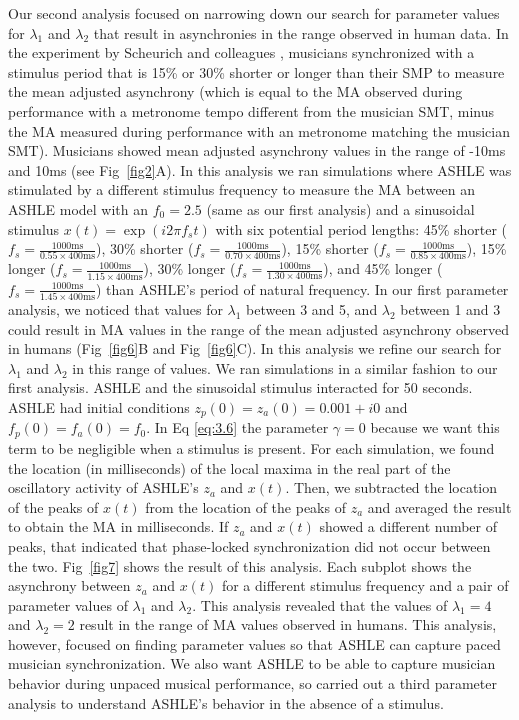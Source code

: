 \documentclass[10pt,letterpaper]{article}
\begin{document}
Our second analysis focused on narrowing down our search for parameter values for $\lambda_1$ and $\lambda_2$ that result in asynchronies in the range observed in human data. In the experiment by Scheurich and colleagues \cite{scheurich2018tapping}, musicians synchronized with a stimulus period that is 15\% or 30\% shorter or longer than their SMP to measure the mean adjusted asynchrony (which is equal to the MA observed during performance with a metronome tempo different from the musician SMT, minus the MA measured during performance with an metronome matching the musician SMT). Musicians showed mean adjusted asynchrony values in the range of -10ms and 10ms (see Fig~\ref{fig2}A). In this analysis we ran simulations where ASHLE was stimulated by a different stimulus frequency to measure the MA between an ASHLE model with an $f_0 = 2.5$ (same as our first analysis) and a sinusoidal stimulus $x(t) = \exp(i2\pi f_s t)$ with six potential period lengths: 45\% shorter ($f_s = \frac{1000\text{ms}}{0.55 \times 400\text{ms}}$), 30\% shorter ($f_s = \frac{1000\text{ms}}{0.70 \times 400\text{ms}}$), 15\% shorter ($f_s = \frac{1000\text{ms}}{0.85 \times 400\text{ms}}$), 15\% longer ($f_s = \frac{1000\text{ms}}{1.15 \times 400\text{ms}}$), 30\% longer ($f_s = \frac{1000\text{ms}}{1.30 \times 400\text{ms}}$), and 45\% longer ($f_s = \frac{1000\text{ms}}{1.45 \times 400\text{ms}}$) than ASHLE's period of natural frequency. In our first parameter analysis, we noticed that values for $\lambda_1$ between 3 and 5, and $\lambda_2$ between 1 and 3 could result in MA values in the range of the mean adjusted asynchrony observed in humans (Fig~\ref{fig6}B and Fig~\ref{fig6}C). In this analysis we refine our search for $\lambda_1$ and $\lambda_2$ in this range of values. We ran simulations in a similar fashion to our first analysis. ASHLE and the sinusoidal stimulus interacted for 50 seconds. ASHLE had initial conditions $z_p(0)=z_a(0)= 0.001 + i0$ and $f_p(0)=f_a(0)=f_0$. In Eq \eqref{eq:3.6} the parameter $\gamma=0$ because we want this term to be negligible when a stimulus is present. For each simulation, we found the location (in milliseconds) of the local maxima in the real part of the oscillatory activity of ASHLE's $z_a$ and $x(t)$. Then, we subtracted the location of the peaks of $x(t)$ from the location of the peaks of $z_a$ and averaged the result to obtain the MA in milliseconds. If $z_a$ and $x(t)$ showed a different number of peaks, that indicated that phase-locked synchronization did not occur between the two. Fig~\ref{fig7} shows the result of this analysis. Each subplot shows the asynchrony between $z_a$ and $x(t)$ for a different stimulus frequency and a pair of parameter values of $\lambda_1$ and $\lambda_2$. This analysis revealed that the values of $\lambda_1 = 4$ and $\lambda_2 = 2$ result in the range of MA values observed in humans. This analysis, however, focused on finding parameter values so that ASHLE can capture paced musician synchronization. We also want ASHLE to be able to capture musician behavior during unpaced musical performance, so carried out a third parameter analysis to understand ASHLE's behavior in the absence of a stimulus.
\end{document}
